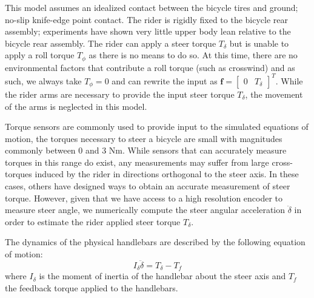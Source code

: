 \documentclass[11pt,a4paper,reqno]{amsart}
\begin{document}
This model assumes an idealized contact between the bicycle tires and ground; no-slip knife-edge point contact.
The rider is rigidly fixed to the bicycle rear assembly; experiments have shown very little upper body lean relative to
the bicycle rear assembly\cite{kooijman2009}.
The rider can apply a steer torque $ T_\delta $ but is unable to apply a roll torque $ T_\phi $ as there is no means to
do so. At this time, there are no environmental factors that contribute a roll torque (such as crosswind) and as such,
we always take $ T_\phi = 0 $ and can rewrite the input as $ \bm{f} = \begin{bmatrix} 0  & T_\delta \end{bmatrix}^T $.
While the rider arms are necessary to provide the input steer torque $ T_\delta $, the movement of the arms is
neglected in this model.

Torque sensors are commonly used to provide input to the simulated equations of motion\cite{FIXME}, the torques
necessary to steer a bicycle are small with magnitudes commonly between 0 and 3 Nm\cite{moore2012}.
While sensors that can accurately measure torques in this range do exist, any measurements may suffer from large
cross-torques induced by the rider in directions orthogonal to the steer axis.
In these cases, others have designed ways to obtain an accurate measurement of steer torque\cite{moore2012}.
However, given that we have access to a high resolution encoder to measure steer angle, we numerically compute the steer
angular acceleration $ \ddot{\delta} $ in order to estimate the rider applied steer torque $ T_\delta $.

The dynamics of the physical handlebars are described by the following equation of motion:
\begin{equation}
    I_\delta \ddot{\delta} = T_\delta - T_f
\end{equation}
where $ I_\delta $ is the moment of inertia of the handlebar about the steer axis and $ T_f $ the feedback torque
applied to the handlebars.
\end{document}
